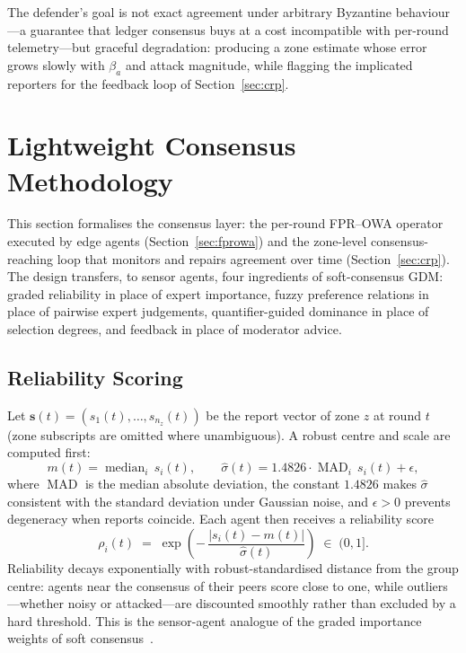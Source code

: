 \documentclass[preprint,11pt]{elsarticle}
\newcommand{\rel}{\rho}
\begin{document}
The defender's goal is not exact agreement under arbitrary Byzantine
behaviour---a guarantee that ledger consensus buys at a cost
incompatible with per-round telemetry---but graceful degradation:
producing a zone estimate whose error grows slowly with $\beta_a$ and
attack magnitude, while flagging the implicated reporters for the
feedback loop of Section~\ref{sec:crp}.

\section{Lightweight Consensus Methodology}
\label{sec:methodology}

This section formalises the consensus layer: the per-round FPR--OWA
operator executed by edge agents (Section~\ref{sec:fprowa}) and the
zone-level consensus-reaching loop that monitors and repairs agreement
over time (Section~\ref{sec:crp}). The design transfers, to sensor
agents, four ingredients of soft-consensus GDM: graded reliability in
place of expert importance, fuzzy preference relations in place of
pairwise expert judgements, quantifier-guided dominance in place of
selection degrees, and feedback in place of moderator advice.

\subsection{Reliability Scoring}
\label{sec:reliability}

Let $\mathbf{s}(t)=(s_1(t),\dots,s_{n_z}(t))$ be the report vector of
zone $z$ at round $t$ (zone subscripts are omitted where unambiguous).
A robust centre and scale are computed first:
\begin{equation}
m(t)=\operatorname{median}_i\, s_i(t),
\qquad
\hat{\sigma}(t)=1.4826\cdot\operatorname{MAD}_i\, s_i(t)+\epsilon,
\label{eq:centerscale}
\end{equation}
where $\operatorname{MAD}$ is the median absolute deviation, the
constant $1.4826$ makes $\hat\sigma$ consistent with the standard
deviation under Gaussian noise, and $\epsilon>0$ prevents degeneracy
when reports coincide. Each agent then receives a reliability score
\begin{equation}
\rel_i(t)\;=\;\exp\!\left(-\,\frac{\lvert s_i(t)-m(t)\rvert}
{\hat{\sigma}(t)}\right)\;\in\;(0,1].
\label{eq:reliability}
\end{equation}
Reliability decays exponentially with robust-standardised distance from
the group centre: agents near the consensus of their peers score close
to one, while outliers---whether noisy or attacked---are discounted
smoothly rather than excluded by a hard threshold. This is the
sensor-agent analogue of the graded importance weights of soft
consensus~\cite{kacprzyk1986,kacprzyk1988}.
\end{document}
